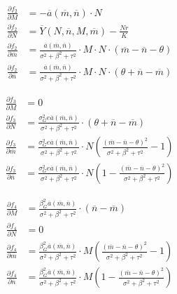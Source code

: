 \documentclass[12pt]{article}
\begin{document}
\begin{align*}
	\frac{\partial f_2}{\partial M} &= -\overline{a}(\overline{m}, \overline{n}) \cdot N \\[.15cm]
	\frac{\partial f_2}{\partial N} &= \overline{Y}(N, \overline{n}, M, \overline{m})  - \frac{Nr}{K} \\[.15cm]
	\frac{\partial f_2}{\partial \overline{m}} &= \frac{\overline{a}(\overline{m}, \overline{n})}{\sigma^2 + \beta^2 + \tau^2} \cdot M \cdot N \cdot (\overline{m} - \overline{n} - \theta) \\[.15cm]
	\frac{\partial f_2}{\partial \overline{n}} &= \frac{\overline{a}(\overline{m}, \overline{n})}{\sigma^2 + \beta^2 + \tau^2} \cdot M \cdot N \cdot (\theta + \overline{n} - \overline{m})
\end{align*}

\begin{align*}
	\frac{\partial f_3}{\partial M} &= 0 \\[.15cm]
	\frac{\partial f_3}{\partial N} &= \frac{\sigma_G^2e\overline{a}(\overline{m}, \overline{n})}{\sigma^2 + \beta^2 + \tau^2} \cdot (\theta + \overline{n} - \overline{m}) \\[.15cm]
	\frac{\partial f_3}{\partial \overline{m}} &= \frac{\sigma_G^2e\overline{a}(\overline{m}, \overline{n})}{\sigma^2 + \beta^2 + \tau^2} \cdot N\left(\frac{(\overline{m} - \overline{n} - \theta)^2}{\sigma^2 + \beta^2 + \tau^2} -1\right) \\[.15cm]
	\frac{\partial f_3}{\partial \overline{n}} &= \frac{\sigma_G^2e\overline{a}(\overline{m}, \overline{n})}{\sigma^2 + \beta^2 + \tau^2} \cdot N\left(1- \frac{(\overline{m} - \overline{n} - \theta)^2}{\sigma^2 + \beta^2 + \tau^2} \right)
\end{align*}

\begin{align*}
	\frac{\partial f_4}{\partial M} &= \frac{\beta_G^2\overline{a}(\overline{m}, \overline{n})}{\sigma^2 + \beta^2 + \tau^2} \cdot (\overline{n} - \overline{m}) \\[.15cm]
	\frac{\partial f_4}{\partial N} &= 0 \\[.15cm]
	\frac{\partial f_4}{\partial \overline{m}} &= \frac{\beta_G^2\overline{a}(\overline{m}, \overline{n})}{\sigma^2 + \beta^2 + \tau^2} \cdot M\left(\frac{(\overline{m} - \overline{n} - \theta)^2}{\sigma^2 + \beta^2 + \tau^2} - 1\right) \\[.15cm]
	\frac{\partial f_4}{\partial \overline{n}} &= \frac{\beta_G^2\overline{a}(\overline{m}, \overline{n})}{\sigma^2 + \beta^2 + \tau^2} \cdot M\left(1 - \frac{(\overline{m} - \overline{n} - \theta)^2}{\sigma^2 + \beta^2 + \tau^2}\right)
\end{align*}
\end{document}
